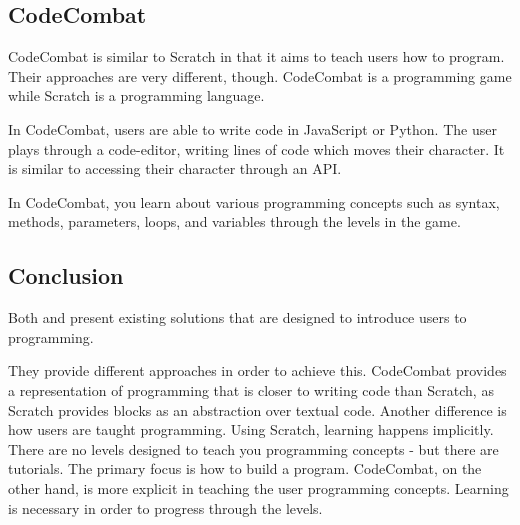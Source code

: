 \subsection{CodeCombat}\label{CodeCombatSection}
CodeCombat is similar to Scratch in that it aims to teach users how to program.
Their approaches are very different, though. CodeCombat is a programming game while Scratch is a programming language.

In CodeCombat, users are able to write code in JavaScript or Python\cite{CodeCombatCodingGames}. The user plays through a code-editor, writing lines of code which moves their character. It is similar to accessing their character through an API.

In CodeCombat, you learn about various programming concepts such as syntax, methods, parameters, loops, and variables through the levels in the game\cite{CodeCombatCodingGames}.

\subsection{Conclusion}
Both  and  present existing solutions that are designed to introduce users to programming.

They provide different approaches in order to achieve this. CodeCombat provides a representation of programming that is closer to writing code than Scratch, as Scratch provides blocks as an abstraction over textual code.
Another difference is how users are taught programming. Using Scratch, learning happens implicitly. There are no levels designed to teach you programming concepts - but there are tutorials. The primary focus is how to build a program. CodeCombat, on the other hand, is more explicit in teaching the user programming concepts. Learning is necessary in order to progress through the levels.

